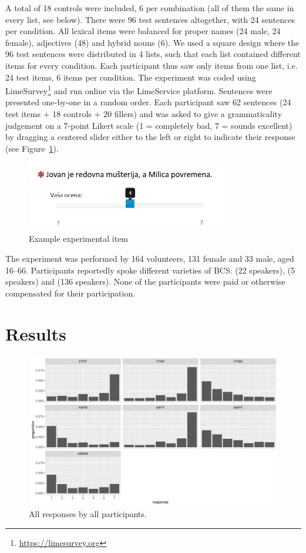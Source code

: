 \documentclass[output=paper,modfonts,newtxmath,hidelinks]{langscibook}
\begin{document}
\noindent A total of 18 controls were included, 6 per combination (all of them the same in every list, see below).			
There were 96 test sentences altogether, with 24 sentences per condition. All lexical items were balanced for proper names (24 male, 24 female), adjectives (48) and hybrid nouns (6).
 We used a  square design where the 96 test sentences were distributed in 4 lists, such that each list contained different items for every condition. 
 Each participant thus saw only items from one list, i.e. 24 test items, 6 items per condition. 
 The experiment was coded using LimeSurvey\footnote{\url{https://limesurvey.org}} and run online via the LimeService platform.
  	 Sentences were presented one-by-one in a random order. 
Each participant saw 62 sentences (24 test items + 18 controls + 20 fillers)  
 and was asked to give a grammaticality judgement on a 7-point Likert scale (1 = completely bad, 7 = sounds excellent) by dragging a centered slider either to the left or right to indicate their response (see Figure~\ref{14:slider}). 
  		
  		\begin{figure}[t]
  			\centering
  			\includegraphics[width=9cm]{figures/14example.jpg}
  			\caption{Example experimental item }
			\label{14:slider}
  		\end{figure}
 		
 The experiment was performed by 164 volunteers, 131 female and 33 male, aged 16--66. Participants reportedly spoke different varieties of BCS:  (22 speakers),  (5 speakers) and  (136 speakers).
 None of the participants were paid or otherwise compensated for their participation.

\section{Results}


\begin{figure}[t]
		\centering
		\includegraphics[height=.35\textheight]{figures/14mmmm-resps-1.pdf}
		\caption{All responses by all participants.}\label{14:fig:all-resps}
	\end{figure}
\end{document}
